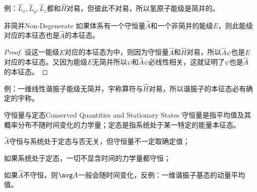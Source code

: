 例：$\hat L_x,\hat L_y,\hat L_z$都和$\hat H$对易，但彼此不对易，所以氢原子能级是简并的。
\begin{theorem}{非简并}{Non-Degenerate}
	如果体系有一个守恒量$\hat A$和一个非简并的能级$E$，则此能级对应的本征态也是$\hat A$的本征态。
\end{theorem}
\begin{proof}
	设这一能级$E$对应的本征态为中，则因为守恒量$\hat A$和$\hat H$对易，所以$\hat A\psi$也是$E$对应的本征态。又因为能级$E$无简并所以$\psi$和$\hat A\psi$必线性相关，这就证明了$\psi$也是$\hat A$的本征态。
\end{proof}
例：一维线性谐振子能级无简并，宇称算符与$\hat H$对易，所以谐振子的本征态必有确定的宇称。
\begin{theorem}{守恒量与定态}{Conserved Quantities and Stationary States}
	守恒量是指平均值及其概率分布不随时间变化的力学量；定态是指系统处于某一特定的能量本征态。
	\begin{compactenum}
		\item $\hat A$守恒与系统处于定态与否无关，但守恒量不一定取确定值；
		\item 如果系统处于定态，一切不显含时间的力学量都守恒；
		\item 如果$\hat A$不守恒，则$\avg A$一般会随时间变化，反例：一维谐振子基态的动量平均值。
	\end{compactenum}
\end{theorem}
